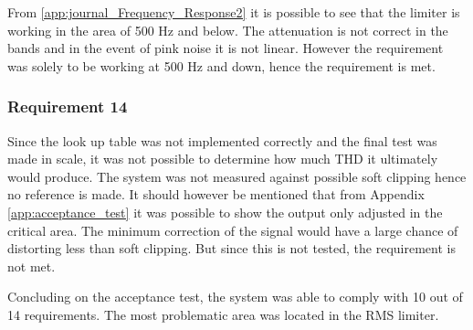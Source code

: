 From \autoref{app:journal_Frequency_Response2} it is possible to see that the limiter is working in the area of 500 Hz and below. The attenuation is not correct in the bands and in the event of pink noise it is not linear. However the requirement was solely to be working at 500 Hz and down, hence the requirement is met.
\vspace*{-5mm}
\subsubsection*{Requirement 14}

Since the look up table was not implemented correctly and the final test was made in scale, it was not possible to determine how much THD it ultimately would produce. The system was not measured against possible soft clipping hence no reference is made. It should however be mentioned that from Appendix \ref{app:acceptance_test} it was possible to show the output only adjusted in the critical area. The minimum correction of the signal would have a large chance of distorting less than soft clipping. But since this is not tested, the requirement is not met.

Concluding on the acceptance test, the system was able to comply with 10 out of 14 requirements. The most problematic area was located in the RMS limiter. 












